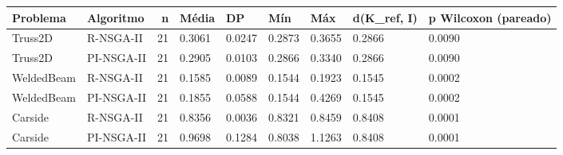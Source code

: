 \begin{tabular}{llrllllll}
\toprule
Problema & Algoritmo & n & Média & DP & Mín & Máx & d(K_ref, I) & p Wilcoxon (pareado) \\
\midrule
Truss2D & R-NSGA-II & 21 & 0.3061 & 0.0247 & 0.2873 & 0.3655 & 0.2866 & 0.0090 \\
Truss2D & PI-NSGA-II & 21 & 0.2905 & 0.0103 & 0.2866 & 0.3340 & 0.2866 & 0.0090 \\
WeldedBeam & R-NSGA-II & 21 & 0.1585 & 0.0089 & 0.1544 & 0.1923 & 0.1545 & 0.0002 \\
WeldedBeam & PI-NSGA-II & 21 & 0.1855 & 0.0588 & 0.1544 & 0.4269 & 0.1545 & 0.0002 \\
Carside & R-NSGA-II & 21 & 0.8356 & 0.0036 & 0.8321 & 0.8459 & 0.8408 & 0.0001 \\
Carside & PI-NSGA-II & 21 & 0.9698 & 0.1284 & 0.8038 & 1.1263 & 0.8408 & 0.0001 \\
\bottomrule
\end{tabular}
